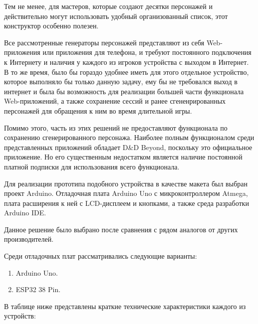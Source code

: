 Тем не менее, для мастеров, которые создают десятки персонажей и действительно могут использовать удобный организованный список, этот конструктор особенно полезен.

Все рассмотренные генераторы персонажей представляют из себя Web-приложения или приложения для телефона, и требуют постоянного подключения к Интернету и наличия у каждого из игроков устройства с выходом в Интернет. В то же время, было бы гораздо удобнее иметь для этого отдельное устройство, которое выполняло бы только данную задачу, ему бы не требовался выход в интернет и была бы возможность для реализации большей части функционала Web-приложений, а также сохранение сессий и ранее сгененрированных персонажей для обращения к ним во время длительной игры.

Помимо этого, часть из этих решений не предоставляют функционала по сохранению сгенерированного персонажа. Наиболее полным функционалом среди представленных приложений обладает D\&D Beyond, поскольку это официальное приложение. Но его существенным недостатком является наличие постоянной платной подписки для использования всего функционала.

Для реализации прототипа подобного устройства в качестве макета был выбран проект Arduino. Отладочная плата Arduino Uno с микроконтроллером Atmega, плата расширения к ней с LCD-дисплеем и кнопками, а также среда разработки Arduino IDE.

Данное решение было выбрано после сравнения с рядом аналогов от других производителей.

Среди отладочных плат рассматривались следующие варианты:

\begin{enumerate}
    \item Arduino Uno.
    \item ESP32 38 Pin.
\end{enumerate}

В таблице ниже представлены краткие технические характеристики каждого из устройств:

